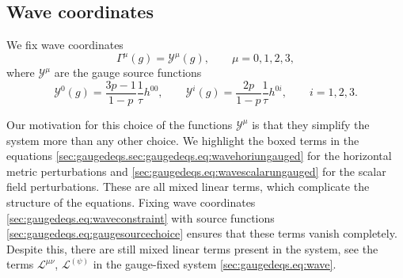 \documentclass{article}
\newcommand{\mc}{\mathcal}
\begin{document}
\subsection{Wave coordinates}
We fix wave coordinates
\begin{equation}\label{sec:gaugedeqs.eq:waveconstraint}
    \Gamma^\mu(g) = \mc{Y}^{\mu}(g),\qquad \mu=0,1,2,3,
\end{equation}
where $\mc{Y}^\mu$ are the gauge source functions
\begin{equation}\label{sec:gaugedeqs.eq:gaugesourcechoice}
    \mc{Y}^0(g) = \frac{3p-1}{1-p}\frac{1}{\tau} h^{00},\qquad \mc{Y}^i(g) = \frac{2p}{1-p}\frac{1}{\tau} h^{0i}, \qquad i=1,2,3.
\end{equation}
\begin{remark}\label{sec:gaugedeqs.rmk:gaugemotivation}
    Our motivation for this choice of the functions $\mc{Y}^\mu$ is that they simplify the system more than any other choice. We highlight the boxed terms in the equations \eqref{sec:gaugedeqs.sec:gaugedeqs.eq:wavehoriungauged} for the horizontal metric perturbations and \eqref{sec:gaugedeqs.eq:wavescalarungauged} for the scalar field perturbations. These are all mixed linear terms, which complicate the structure of the equations. Fixing wave coordinates \eqref{sec:gaugedeqs.eq:waveconstraint} with source functions \eqref{sec:gaugedeqs.eq:gaugesourcechoice} ensures that these terms vanish completely. Despite this, there are still mixed linear terms present in the system, see the terms $\mc{L}^{\mu\nu}$, $\mc{L}^{(\psi)}$ in the gauge-fixed system \eqref{sec:gaugedeqs.eq:wave}.  
\end{remark}
\end{document}
